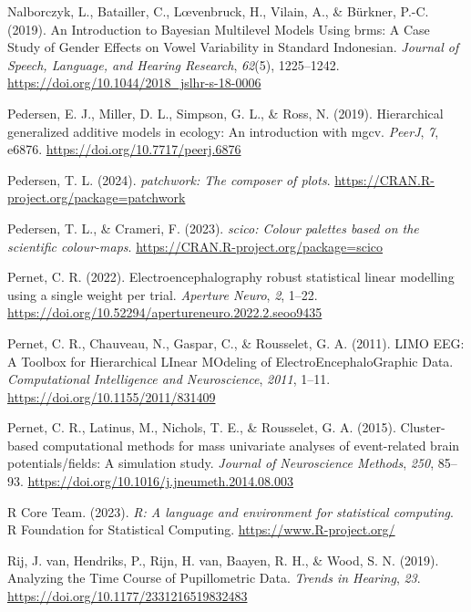 \documentclass[
  doc,
  floatsintext,
  longtable,
  a4paper,
  nolmodern,
  notxfonts,
  notimes,
  colorlinks=true,linkcolor=blue,citecolor=blue,urlcolor=blue]{apa7}
\newlength{\cslhangindent}
\newenvironment{CSLReferences}[2] %
 {\begin{list}{}{%
  \setlength{\itemindent}{0pt}
  \setlength{\leftmargin}{0pt}
  \setlength{\parsep}{0pt}
  \ifodd #1
   \setlength{\leftmargin}{\cslhangindent}
   \setlength{\itemindent}{-1\cslhangindent}
  \fi
  \setlength{\itemsep}{#2\baselineskip}}}
 {\end{list}}
\begin{document}
\begin{CSLReferences}{1}{0}
Nalborczyk, L., Batailler, C., Lœvenbruck, H., Vilain, A., \& Bürkner,
P.-C. (2019). An Introduction to Bayesian Multilevel Models Using brms:
A Case Study of Gender Effects on Vowel Variability in Standard
Indonesian. \emph{Journal of Speech, Language, and Hearing Research},
\emph{62}(5), 1225--1242.
\url{https://doi.org/10.1044/2018_jslhr-s-18-0006}

Pedersen, E. J., Miller, D. L., Simpson, G. L., \& Ross, N. (2019).
Hierarchical generalized additive models in ecology: An introduction
with mgcv. \emph{PeerJ}, \emph{7}, e6876.
\url{https://doi.org/10.7717/peerj.6876}

Pedersen, T. L. (2024). \emph{{patchwork}: The composer of plots}.
\url{https://CRAN.R-project.org/package=patchwork}

Pedersen, T. L., \& Crameri, F. (2023). \emph{{scico}: Colour palettes
based on the scientific colour-maps}.
\url{https://CRAN.R-project.org/package=scico}

Pernet, C. R. (2022). Electroencephalography robust statistical linear
modelling using a single weight per trial. \emph{Aperture Neuro},
\emph{2}, 1--22.
\url{https://doi.org/10.52294/apertureneuro.2022.2.seoo9435}

Pernet, C. R., Chauveau, N., Gaspar, C., \& Rousselet, G. A. (2011).
LIMO EEG: A Toolbox for Hierarchical LInear MOdeling of
ElectroEncephaloGraphic Data. \emph{Computational Intelligence and
Neuroscience}, \emph{2011}, 1--11.
\url{https://doi.org/10.1155/2011/831409}

Pernet, C. R., Latinus, M., Nichols, T. E., \& Rousselet, G. A. (2015).
Cluster-based computational methods for mass univariate analyses of
event-related brain potentials/fields: A simulation study. \emph{Journal
of Neuroscience Methods}, \emph{250}, 85--93.
\url{https://doi.org/10.1016/j.jneumeth.2014.08.003}

R Core Team. (2023). \emph{{R}: A language and environment for
statistical computing}. R Foundation for Statistical Computing.
\url{https://www.R-project.org/}

Rij, J. van, Hendriks, P., Rijn, H. van, Baayen, R. H., \& Wood, S. N.
(2019). Analyzing the Time Course of Pupillometric Data. \emph{Trends in
Hearing}, \emph{23}. \url{https://doi.org/10.1177/2331216519832483}


\end{CSLReferences}
\end{document}
